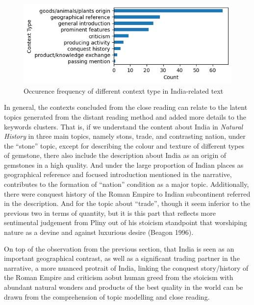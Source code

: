 \documentclass[
  12pt,
]{article}
\begin{document}
\begin{figure}

{\centering \includegraphics{NHthesis_structure_files/figure-pdf/fig-context_type_freq-output-1.png}

}

\caption{\label{fig-context_type_freq}Occurence frequency of different
context type in India-related text}

\end{figure}

In general, the contexts concluded from the close reading can relate to
the latent topics generated from the distant reading method and added
more details to the keywords clusters. That is, if we understand the
content about India in \emph{Natural History} in three main topics,
namely stons, trade, and contrasting nation, under the ``stone'' topic,
except for describing the colour and texture of different types of
gemstone, there also include the description about India as an origin of
gemstones in a high quality. And under the large proportion of Indian
places as geographical reference and focused introduction mentioned in
the narrative, contributes to the formation of ``nation'' condition as a
major topic. Additionally, there were conquest history of the Roman
Empire to Indian subcontinent referred in the description. And for the
topic about ``trade'', though it seem inferior to the previous two in
terms of quantity, but it is this part that reflects more sentimental
judgement from Pliny out of his stoicism standpoint that worshiping
nature as a devine and against luxurious desire (Beagon 1996).

On top of the observation from the previous section, that India is seen
as an important geographical contrast, as well as a significant trading
partner in the narrative, a more nuanced protrait of India, linking the
conquest story/history of the Roman Empire and criticism aobut human
greed from the stoicism with abundant natural wonders and products of
the best quality in the world can be drawn from the comprehension of
topic modelling and close reading.
\end{document}

